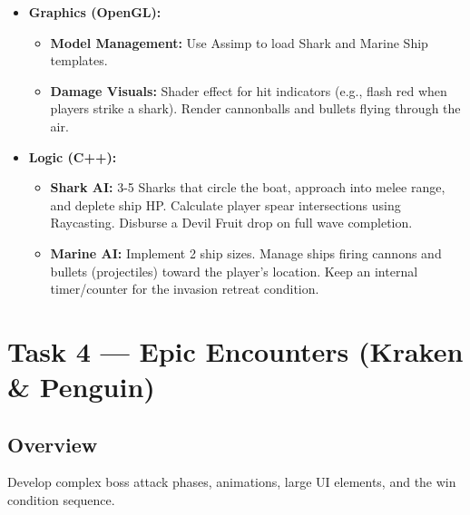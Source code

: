 \documentclass[12pt,a4paper]{article}
\begin{document}
\begin{itemize}[leftmargin=*]
    \item \textbf{Graphics (OpenGL):}
    \begin{itemize}
        \item \textbf{Model Management:} Use Assimp to load Shark and Marine Ship templates. 
        \item \textbf{Damage Visuals:} Shader effect for hit indicators (e.g., flash red when players strike a shark). Render cannonballs and bullets flying through the air.
    \end{itemize}
    \item \textbf{Logic (C++):}
    \begin{itemize}
        \item \textbf{Shark AI:} 3-5 Sharks that circle the boat, approach into melee range, and deplete ship HP. Calculate player spear intersections using Raycasting. Disburse a Devil Fruit drop on full wave completion.
        \item \textbf{Marine AI:} Implement 2 ship sizes. Manage ships firing cannons and bullets (projectiles) toward the player's location. Keep an internal timer/counter for the invasion retreat condition.
    \end{itemize}
\end{itemize}

\section{Task 4 — Epic Encounters (Kraken \& Penguin)}

\subsection{Overview}
Develop complex boss attack phases, animations, large UI elements, and the win condition sequence.
\end{document}
